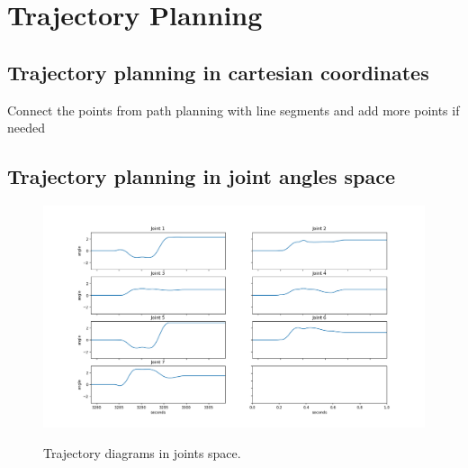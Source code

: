 \section{Trajectory Planning}

\subsection{Trajectory planning in cartesian coordinates}

Connect the points from path planning with line segments and add more points if needed

\subsection{Trajectory planning in joint angles space}

\begin{center}
\begin{figure}[H]
\centering
\includegraphics[width=\textwidth]{images/trajectory1-test1.png}\\
\caption{Trajectory diagrams in joints space.}
\end{figure}
\end{center}